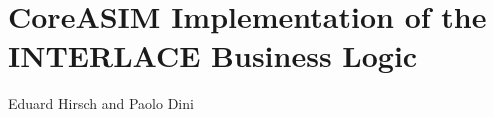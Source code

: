 \chapter{CoreASIM Implementation of the INTERLACE Business Logic}
\label{ch:CoreAsimImplementation}

\vspace{-1cm}
\begin{center}
Eduard Hirsch and Paolo Dini
\end{center}

